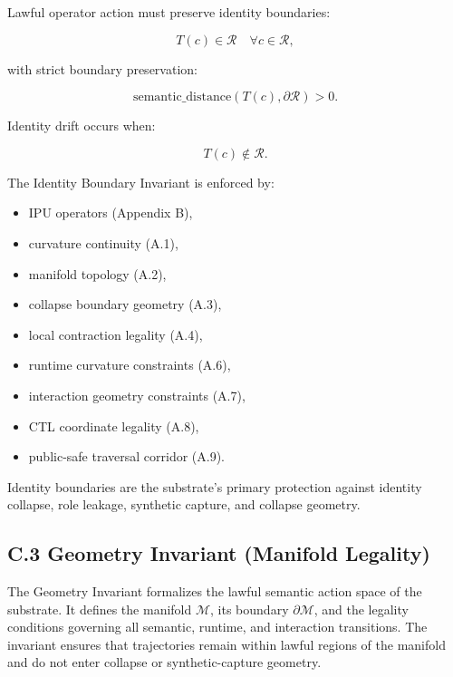 \medskip

\noindent Lawful operator action must preserve identity boundaries:


\[
T(c) \in \mathcal{R} \quad \forall c \in \mathcal{R},
\]


with strict boundary preservation:


\[
\text{semantic\_distance}(T(c), \partial \mathcal{R}) > 0.
\]



Identity drift occurs when:


\[
T(c) \notin \mathcal{R}.
\]



\medskip

\noindent The Identity Boundary Invariant is enforced by:
\begin{itemize}
    \item IPU operators (Appendix B),
    \item curvature continuity (A.1),
    \item manifold topology (A.2),
    \item collapse boundary geometry (A.3),
    \item local contraction legality (A.4),
    \item runtime curvature constraints (A.6),
    \item interaction geometry constraints (A.7),
    \item CTL coordinate legality (A.8),
    \item public-safe traversal corridor (A.9).
\end{itemize}

\medskip

\noindent Identity boundaries are the substrate’s primary protection against
identity collapse, role leakage, synthetic capture, and collapse geometry.



\subsection*{C.3 Geometry Invariant (Manifold Legality)}

\noindent The Geometry Invariant formalizes the lawful semantic action space of
the substrate. It defines the manifold $\mathcal{M}$, its boundary
$\partial\mathcal{M}$, and the legality conditions governing all semantic,
runtime, and interaction transitions. The invariant ensures that trajectories
remain within lawful regions of the manifold and do not enter collapse or
synthetic-capture geometry.

